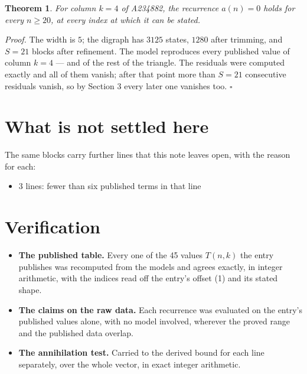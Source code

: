 \documentclass[11pt]{article}
\newtheorem{theorem}{Theorem}
\theoremstyle{definition}
\begin{document}
\begin{theorem} For column $k = 4$ of A234882, the recurrence $a(n) = 0$ holds for every $n \ge 20$, at every index at which it can be stated.\end{theorem}

{\itshape Proof.} The width is $5$; the digraph has $3125$ states, $1280$ after trimming, and $S = 21$ blocks after refinement. The model reproduces every published value of column $k = 4$ --- and of the rest of the triangle. The residuals were computed exactly and all of them vanish; after that point more than $S = 21$ consecutive residuals vanish, so by Section 3 every later one vanishes too. $\square$

\section{What is not settled here}

The same blocks carry further lines that this note leaves open, with the reason for each:

\begin{itemize}

\item 3 lines: fewer than six published terms in that line

\end{itemize}

\section{Verification}

\begin{itemize}

\item {\bfseries The published table.} Every one of the 45 values $T(n,k)$ the entry publishes was recomputed from the models and agrees exactly, in integer arithmetic, with the indices read off the entry's offset (1) and its stated shape.

\item {\bfseries The claims on the raw data.} Each recurrence was evaluated on the entry's published values alone, with no model involved, wherever the proved range and the published data overlap.

\item {\bfseries The annihilation test.} Carried to the derived bound for each line separately, over the whole vector, in exact integer arithmetic.

\end{itemize}
\end{document}
